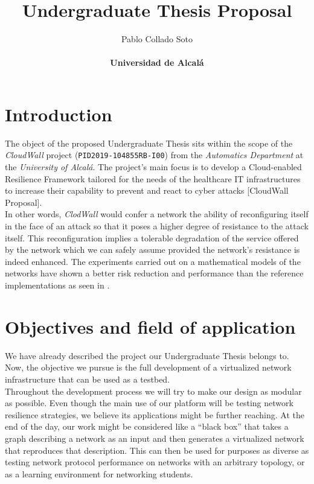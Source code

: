 \documentclass[12pt]{article}
\title{\vspace{-1cm}Undergraduate Thesis Proposal}
\author{Pablo Collado Soto \\ \\ \textbf{Universidad de Alcalá}}
\date{}
\begin{document}
    \maketitle

    \section{Introduction}
        The object of the proposed Undergraduate Thesis sits within the scope of the \textit{CloudWall} project (\texttt{PID2019-104855RB-I00}) from the \textit{Automatics Department} at the \textit{University of Alcalá}. The project's main focus is to develop a Cloud-enabled Resilience Framework
        tailored for the needs of the healthcare IT infrastructures to increase their capability to prevent and react to cyber attacks [CloudWall Proposal].\\

        In other words, \textit{ClodWall} would confer a network the ability of reconfiguring itself in the face of an attack so that it poses a higher degree of resistance to the attack itself. This reconfiguration implies a tolerable degradation of the service offered by the network which we can safely assume provided the network's resistance is indeed enhanced. The experiments carried out on a mathematical models of the networks have shown a better risk reduction and performance than the reference implementations as seen in \cite{bib:REACT}.\\

    \section{Objectives and field of application}
        We have already described the project our Undergraduate Thesis belongs to. Now, the objective we pursue is the full development of a virtualized network infrastructure that can be used as a testbed.\\

        Throughout the development process we will try to make our design as modular as possible. Even though the main use of our platform will be testing network resilience strategies, we believe its applications might be further reaching. At the end of the day, our work might be considered like a ``black box'' that takes a graph describing a network as an input and then generates a virtualized network that reproduces that description. This can then be used for purposes as diverse as testing network protocol performance on networks with an arbitrary topology, or as a learning environment for networking students.\\
\end{document}
